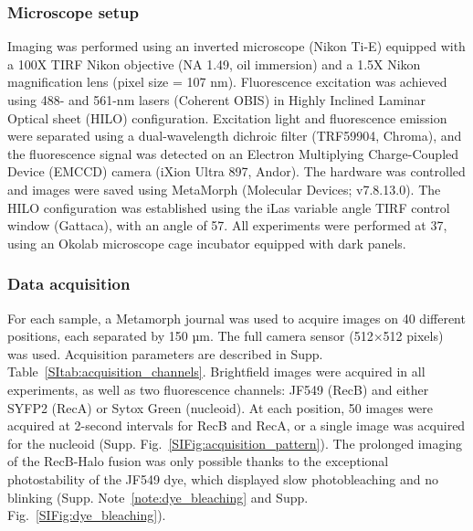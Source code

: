 \subsubsection*{Microscope setup}
Imaging was performed using an inverted microscope (Nikon Ti-E) equipped with a 100X TIRF Nikon objective (NA 1.49, oil immersion) and a 1.5X Nikon magnification lens (pixel size = 107 nm). Fluorescence excitation was achieved using 488- and 561-nm lasers (Coherent OBIS) in Highly Inclined Laminar Optical sheet (HILO) configuration. Excitation light and fluorescence emission were separated using a dual-wavelength dichroic filter (TRF59904, Chroma), and the fluorescence signal was detected on an Electron Multiplying Charge-Coupled Device (EMCCD) camera (iXion Ultra 897, Andor). The hardware was controlled and images were saved using MetaMorph (Molecular Devices; v7.8.13.0). The HILO configuration was established using the iLas variable angle TIRF control window (Gattaca), with an angle of 57\degree. All experiments were performed at 37\celsius, using an Okolab microscope cage incubator equipped with dark panels.

\subsubsection*{Data acquisition}
For each sample, a Metamorph journal was used to acquire images on 40 different positions, each separated by 150 µm. The full camera sensor (512$\times$512 pixels) was used. Acquisition parameters are described in Supp. Table~\ref{SItab:acquisition_channels}. Brightfield images were acquired in all experiments, as well as two fluorescence channels: JF549 (RecB) and either SYFP2 (RecA) or Sytox Green (nucleoid). At each position, 50 images were acquired at 2-second intervals for RecB and RecA, or a single image was acquired for the nucleoid (Supp. Fig.~\ref{SIFig:acquisition_pattern}). The prolonged imaging of the RecB-Halo fusion was only possible thanks to the exceptional photostability of the JF549 dye, which displayed slow photobleaching and no blinking (Supp. Note~\ref{note:dye_bleaching} and Supp. Fig.~\ref{SIFig:dye_bleaching}).

